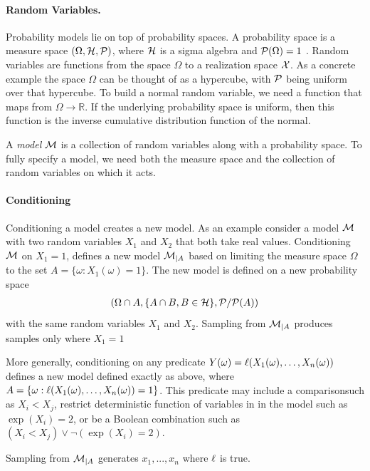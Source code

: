 \paragraph{Random Variables.} Probability models lie on top of probability
spaces. A probability space is a measure space $(\Omega, {\cal H}, {\cal P})$,
where ${\cal H}$ is a sigma algebra and ${\cal P}(\Omega) = 1$ \citep{ccinlar2011probability}. Random variables are
functions from the space $\Omega$ to a realization space ${\cal X}$. As a concrete
example the space $\Omega$ can be thought of as a hypercube, with ${\cal P}$ being
uniform over that hypercube. To build a normal random variable, we need a function
that maps from $\Omega \to \mathbb{R}$. If the underlying probability space is uniform, then
this function is the inverse cumulative distribution function of the normal.

A \emph{model} ${\cal M}$ is a collection of random variables along with a probability space.
To fully specify a model, we need both the measure space and the
collection of random variables on which it acts.

\paragraph{Conditioning}

Conditioning a model creates a new model.
As an example consider a model ${\cal M}$ with two
random variables $X_1$ and $X_2$ that both take real values. Conditioning
${\cal M}$ on $X_1 = 1$, defines a new model ${\cal M}_{|A}$ based on limiting the measure space
$\Omega$ to the set $A = \{ \omega : X_1(\omega) = 1\}$.
The new model is defined on a new probability space
\begin{align*}
	(\Omega \cap A, \{A \cap B, B \in {\cal H} \}, {\cal P} / {\cal P}(A))
\end{align*}
with the same random variables $X_1$ and $X_2$.
Sampling from ${\cal M}_{|A}$ produces
samples only where $X_1 = 1$

More generally, conditioning on any predicate $Y(\omega) = \operatorname{\ell}(X_1(\omega), \dots, X_n(\omega))$
defines a new model defined exactly as above, where $A = \{\omega : \operatorname{\ell}(X_1(\omega), \dots, X_n(\omega)) = 1\}$.
This predicate may include a comparisonsuch as $X_i < X_j$, restrict deterministic function of variables in in the model such as $\exp(X_i) = 2$, or be a Boolean combination such as $(X_i < X_j) \lor \neg(\exp(X_i) = 2)$.


Sampling from ${\cal M}_{|A}$ generates $x_1, ..., x_n$ where $\operatorname{\ell}	$ is true.

